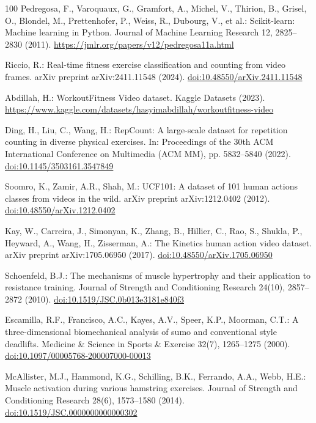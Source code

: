 \documentclass[runningheads]{llncs}
\begin{document}
\begin{thebibliography}{100}
Pedregosa, F., Varoquaux, G., Gramfort, A., Michel, V., Thirion, B., Grisel, O., Blondel, M., Prettenhofer, P., Weiss, R., Dubourg, V., et al.: Scikit-learn: Machine learning in Python. Journal of Machine Learning Research 12, 2825--2830 (2011). \url{https://jmlr.org/papers/v12/pedregosa11a.html}

Riccio, R.: Real-time fitness exercise classification and counting from video frames. arXiv preprint arXiv:2411.11548 (2024). \href{https://doi.org/10.48550/arXiv.2411.11548}{doi:10.48550/arXiv.2411.11548}

Abdillah, H.: WorkoutFitness Video dataset. Kaggle Datasets (2023). \url{https://www.kaggle.com/datasets/hasyimabdillah/workoutfitness-video}

Ding, H., Liu, C., Wang, H.: RepCount: A large-scale dataset for repetition counting in diverse physical exercises. In: Proceedings of the 30th ACM International Conference on Multimedia (ACM MM), pp. 5832--5840 (2022). \href{https://doi.org/10.1145/3503161.3547849}{doi:10.1145/3503161.3547849}

Soomro, K., Zamir, A.R., Shah, M.: UCF101: A dataset of 101 human actions classes from videos in the wild. arXiv preprint arXiv:1212.0402 (2012). \href{https://doi.org/10.48550/arXiv.1212.0402}{doi:10.48550/arXiv.1212.0402}

Kay, W., Carreira, J., Simonyan, K., Zhang, B., Hillier, C., Rao, S., Shukla, P., Heyward, A., Wang, H., Zisserman, A.: The Kinetics human action video dataset. arXiv preprint arXiv:1705.06950 (2017). \href{https://doi.org/10.48550/arXiv.1705.06950}{doi:10.48550/arXiv.1705.06950}

Schoenfeld, B.J.: The mechanisms of muscle hypertrophy and their application to resistance training. Journal of Strength and Conditioning Research 24(10), 2857--2872 (2010). \href{https://doi.org/10.1519/JSC.0b013e3181e840f3}{doi:10.1519/JSC.0b013e3181e840f3}

Escamilla, R.F., Francisco, A.C., Kayes, A.V., Speer, K.P., Moorman, C.T.: A three-dimensional biomechanical analysis of sumo and conventional style deadlifts. Medicine \& Science in Sports \& Exercise 32(7), 1265--1275 (2000). \href{https://doi.org/10.1097/00005768-200007000-00013}{doi:10.1097/00005768-200007000-00013}

McAllister, M.J., Hammond, K.G., Schilling, B.K., Ferrando, A.A., Webb, H.E.: Muscle activation during various hamstring exercises. Journal of Strength and Conditioning Research 28(6), 1573--1580 (2014). \href{https://doi.org/10.1519/JSC.0000000000000302}{doi:10.1519/JSC.0000000000000302}


\end{thebibliography}
\end{document}

